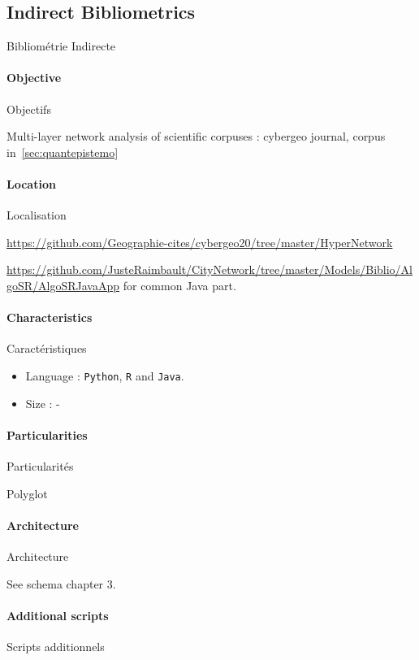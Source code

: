 

\subsection{Indirect Bibliometrics}{Bibliométrie Indirecte}

\paragraph{Objective}{Objectifs}

Multi-layer network analysis of scientific corpuses : cybergeo journal, corpus in~\ref{sec:quantepistemo}

\paragraph{Location}{Localisation}

\url{https://github.com/Geographie-cites/cybergeo20/tree/master/HyperNetwork}

\url{https://github.com/JusteRaimbault/CityNetwork/tree/master/Models/Biblio/AlgoSR/AlgoSRJavaApp} for common Java part.

\paragraph{Characteristics}{Caractéristiques}

\begin{itemize}
\item Language : \texttt{Python}, \texttt{R} and \texttt{Java}.
\item Size : -
\end{itemize}


\paragraph{Particularities}{Particularités}

Polyglot 

\paragraph{Architecture}{Architecture}

See schema chapter 3.

\paragraph{Additional scripts}{Scripts additionnels}

